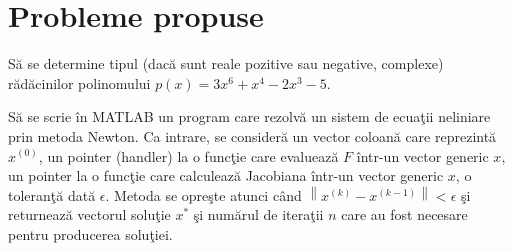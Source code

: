 \documentclass{exam}
\begin{document}
\section{Probleme propuse}

\begin{questions}

	\question Să se determine tipul (dacă sunt reale pozitive sau negative,
	complexe) rădăcinilor polinomului $p(x)=3x^{6}+x^{4}-2x^{3}-5$.

	\question Să se scrie în MATLAB un program care rezolvă un sistem de ecuaţii
	neliniare prin metoda Newton. Ca intrare, se consideră un vector coloană care
	reprezintă $x^{(0)}$, un pointer (handler) la o funcţie care evaluează $F$
	într-un vector generic $x$, un pointer la o funcţie care calculează Jacobiana
	într-un vector generic $x$, o toleranţă dată $\epsilon$. Metoda se opreşte
	atunci când  $\left \| x^{(k)}-x^{(k-1)} \right \|< \epsilon$ şi returnează
	vectorul soluţie $x^{*}$ şi numărul de iteraţii $n$ care au fost necesare pentru
	producerea soluţiei.

\end{questions}



\end{document}
